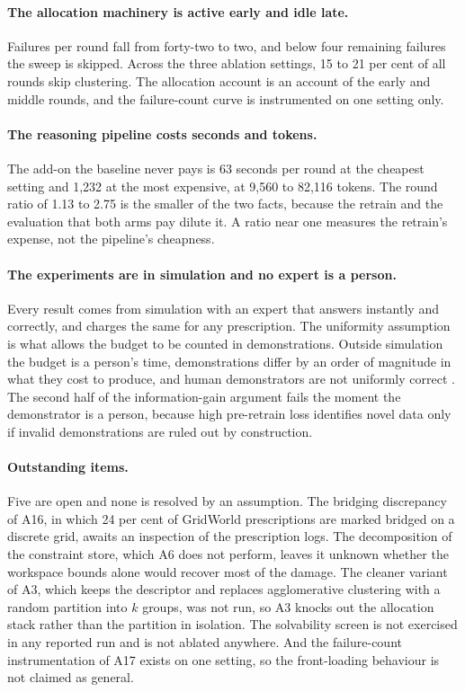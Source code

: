 \documentclass[letterpaper]{article}
\begin{document}
\paragraph{The allocation machinery is active early and idle late.} Failures per round
fall from forty-two to two, and below four remaining failures the sweep is skipped.
Across the three ablation settings, 15 to 21 per cent of all rounds skip clustering. The
allocation account is an account of the early and middle rounds, and the failure-count
curve is instrumented on one setting only.

\paragraph{The reasoning pipeline costs seconds and tokens.} The add-on the baseline
never pays is 63 seconds per round at the cheapest setting and 1,232 at the most
expensive, at 9,560 to 82,116 tokens. The round ratio of 1.13 to 2.75 is the smaller of
the two facts, because the retrain and the evaluation that both arms pay dilute it. A
ratio near one measures the retrain's expense, not the pipeline's cheapness.

\paragraph{The experiments are in simulation and no expert is a person.} Every result
comes from simulation with an expert that answers instantly and correctly, and charges
the same for any prescription. The uniformity assumption is what allows the
budget to be counted in demonstrations. Outside simulation the budget is a person's time,
demonstrations differ by an order of magnitude in what they cost to produce, and human
demonstrators are not uniformly correct
\citep{belkhale2023dataquality, khazatsky2024droid, mandlekar2020iwr,
mandlekar2018roboturk}. The second half of the information-gain argument fails the moment
the demonstrator is a person, because high pre-retrain loss identifies novel data only if
invalid demonstrations are ruled out by construction.

\paragraph{Outstanding items.} Five are open and none is resolved by an assumption. The
bridging discrepancy of A16, in which 24 per cent of GridWorld prescriptions are marked
bridged on a discrete grid, awaits an inspection of the prescription logs. The
decomposition of the constraint store, which A6 does not perform, leaves it unknown
whether the workspace bounds alone would recover most of the damage. The cleaner variant
of A3, which keeps the descriptor and replaces agglomerative clustering with a random
partition into $k$ groups, was not run, so A3 knocks out the allocation stack rather than
the partition in isolation. The solvability screen is not exercised in any reported run
and is not ablated anywhere. And the failure-count instrumentation of A17 exists on one
setting, so the front-loading behaviour is not claimed as general.


\end{document}
